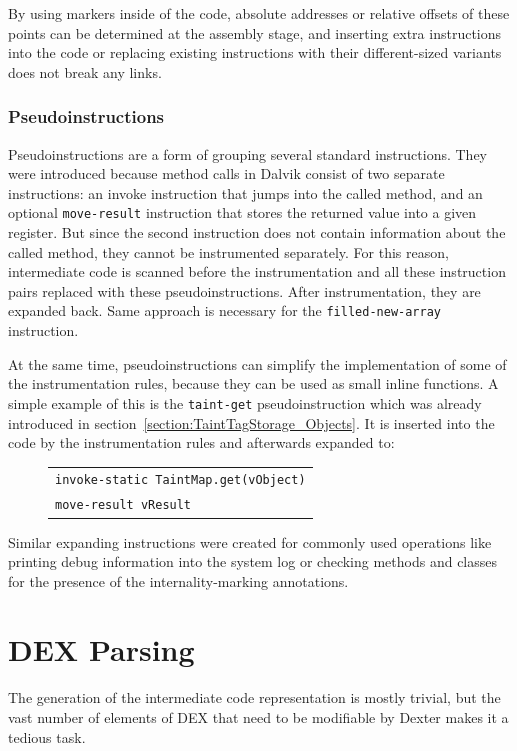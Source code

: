 \documentclass[12pt,twoside,notitlepage]{report}
\newcommand{\centerbox}[1] {
	\begin{center}
	\begin{footnotesize}
	\begin{tabular}{l}
		#1
	\end{tabular}
	\end{footnotesize}
	\end{center}
}
\newcommand{\asm}[1] {\texttt{#1}}
\begin{document}
By using markers inside of the code, absolute addresses or relative offsets of these points can be determined at the assembly stage, and inserting extra instructions into the code or replacing existing instructions with their different-sized variants does not break any links.

\subsubsection{Pseudoinstructions}
\label{section:Code_Pseudoinstructions}

Pseudoinstructions are a form of grouping several standard instructions. They were introduced because method calls in Dalvik consist of two separate instructions: an invoke instruction that jumps into the called method, and an optional \verb$move-result$ instruction that stores the returned value into a given register. But since the second instruction does not contain information about the called method, they cannot be instrumented separately. For this reason, intermediate code is scanned before the instrumentation and all these instruction pairs replaced with these pseudoinstructions. After instrumentation, they are expanded back. Same approach is necessary for the \verb$filled-new-array$ instruction.

At the same time, pseudoinstructions can simplify the implementation of some of the instrumentation rules, because they can be used as small inline functions. A simple example of this is the \verb$taint-get$ pseudoinstruction which was already introduced in section~\ref{section:TaintTagStorage_Objects}. It is inserted into the code by the instrumentation rules and afterwards expanded to:
	\begin{figure}[H]
		\centerbox{
			\asm{invoke-static TaintMap.get(vObject)} \\
			\asm{move-result vResult}
		}
	\end{figure}
Similar expanding instructions were created for commonly used operations like printing debug information into the system log or checking methods and classes for the presence of the internality-marking annotations.

\section{DEX Parsing}

The generation of the intermediate code representation is mostly trivial, but the vast number of elements of DEX that need to be modifiable by Dexter makes it a tedious task. 
\end{document}
